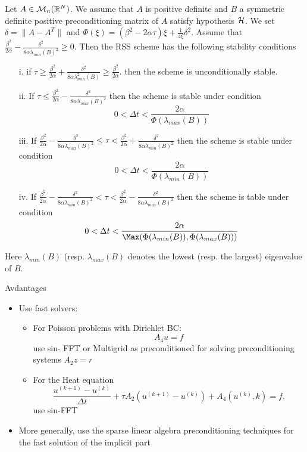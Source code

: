 \documentclass[hyperref={pdfpagemode=FullScreen},9pt]{beamer}
\newcommand{\Frac}[2] {\frac{\textstyle #1} {\textstyle #2}}
\begin{document}
\begin{frame}
\begin{theorem}
Let $A \in {\cal M}_{n}({\mathbb R}^N)$. We assume that $A$ is positive definite and $B$ a symmetric definite positive preconditioning matrix of $A$ satisfy hypothesis ${\cal H}$. We set
$\delta= \parallel A-A^T\parallel$ and $\Phi(\xi)= (\beta^2-2\alpha \tau)\xi + \Frac{1}{4\xi}\delta^2$.
Assume that $\Frac{\beta^2}{2\alpha}-\Frac{\delta^2}{8\alpha \lambda_{min}(B)^2} \ge 0$. Then the RSS scheme has the following stability conditions
\begin{itemize}
\item[i.] if $
\tau \ge \Frac{\beta^2}{2\alpha}+\Frac{\delta^2}{8\alpha \lambda^2_{min}(B)} \ge \Frac{\beta^2}{2\alpha}.
$
then the scheme is unconditionally stable.
\item [ii.] If $\tau \le \Frac{\beta^2}{2\alpha}-\Frac{\delta^2}{8\alpha \lambda_{max}(B)^2}$ then the scheme is stable under condition
$$
0<\Delta t < \Frac{2\alpha}{\Phi(\lambda_{max}(B))}
$$
\item[iii.] If $\Frac{\beta^2}{2\alpha}-\Frac{\delta^2}{8\alpha \lambda_{max}(B)^2}\le \tau < 
\Frac{\beta^2}{2\alpha}+\Frac{\delta^2}{8\alpha \lambda_{min}(B)^2}$
then the scheme is stable under condition
$$
0<\Delta t < \Frac{2\alpha}{\Phi(\lambda_{min}(B))}
$$
\item [iv.] If $
\Frac{\beta^2}{2\alpha}-\Frac{\delta^2}{8\alpha \lambda_{min}(B)^2}< \tau <\Frac{\beta^2}{2\alpha}-\Frac{\delta^2}{8\alpha \lambda_{max}(B)^2}
$
 then the scheme is table under condition
$$
0<\Delta t < \Frac{2\alpha}{\Max(\Phi(\lambda_{min}(B)),\Phi(\lambda_{max}(B)))}
$$
\end{itemize}
Here $\lambda_{min}(B)$ (resp.  $\lambda_{max}(B)$ denotes the lowest (resp. the largest) eigenvalue of $B$.
\label{theo_gen_stab}
\end{theorem}
\end{frame}
 \begin{frame}
 \begin{block}{Avdantages}
 \begin{itemize}
 \item Use fast solvers:
\begin{itemize}
\item For Poisson problems with Dirichlet BC:
$$
A_4u=f
 $$
use  sin- FFT  or Multigrid as preconditioned for solving preconditioning systems $A_2z=r$
\item For the Heat equation
$$
\Frac{u^{(k+1)}-u^{(k)}}{\Delta t}+\tau
A_2(u^{(k+1)}-u^{(k)})+A_4(u^{(k)},k)=f.
$$
use sin-FFT
\end{itemize}
 \item More generally, use the sparse linear algebra preconditioning techniques for the fast solution
 of the implicit part
 \end{itemize}
 \end{block}
 \end{frame}
\end{document}
